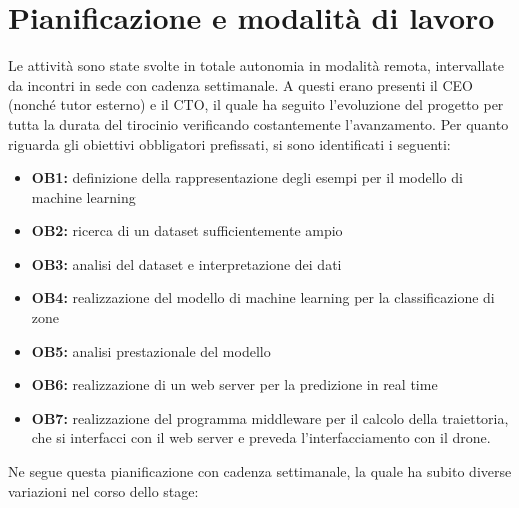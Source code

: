 \section{Pianificazione e modalità di lavoro}
\label{sec:pianificazione}
Le attività sono state svolte in totale autonomia in modalità remota, intervallate da incontri in sede con cadenza settimanale.
A questi erano presenti il CEO (nonché tutor esterno) e il CTO, il quale ha seguito l'evoluzione del progetto per tutta la durata del tirocinio verificando
costantemente l'avanzamento.
Per quanto riguarda gli obiettivi obbligatori prefissati, si sono identificati i seguenti:
\begin{itemize}
		\item \textbf{OB1:} definizione della rappresentazione degli esempi per il modello di machine learning
		\item \textbf{OB2:} ricerca di un dataset sufficientemente ampio
		\item \textbf{OB3:} analisi del dataset e interpretazione dei dati
		\item \textbf{OB4:} realizzazione del modello di machine learning per la classificazione di zone
		\item \textbf{OB5:} analisi prestazionale del modello
		\item \textbf{OB6:} realizzazione di un web server per la predizione in real time
		\item \textbf{OB7:} realizzazione del programma middleware per il calcolo della traiettoria, che si interfacci con il web server e preveda l'interfacciamento con il drone.
\end{itemize}
Ne segue questa pianificazione con cadenza settimanale, la quale ha subito diverse variazioni nel corso dello stage:
